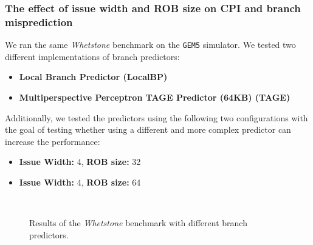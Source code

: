 \documentclass[10pt]{article}
\begin{document}
\subsubsection{The effect of issue width and ROB size on CPI and branch misprediction}
We ran the same \textit{Whetstone} benchmark on the \texttt{GEM5} simulator. We tested two different implementations of branch predictors:

\begin{itemize}
    \item \textbf{Local Branch Predictor (LocalBP)}
    \item \textbf{Multiperspective Perceptron TAGE Predictor (64KB) (TAGE)}
\end{itemize}

Additionally, we tested the predictors using the following two configurations with the goal of testing whether using a different and more complex predictor can increase the performance:

\begin{itemize}
    \item \textbf{Issue Width:} 4, \textbf{ROB size:} 32
    \item \textbf{Issue Width:} 4, \textbf{ROB size:} 64
\end{itemize}

\begin{figure}[htb!]
    \centering
    \hfill
    \\
    \caption{Results of the \textit{Whetstone} benchmark with different branch predictors.}
    \label{fig:task1:subtask2}
\end{figure}
\end{document}

